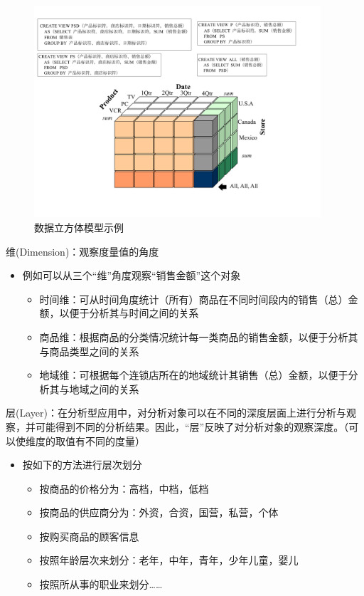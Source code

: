 \begin{solution}
\begin{figure}[H]
    \centering
    \vspace{-0.2em}
    \includegraphics[width=0.95\textwidth]{images/数据立方体.pdf}
    \caption*{数据立方体模型示例}
    \vspace{-1em}
\end{figure}

维(Dimension)：观察度量值的角度
\begin{itemize}
    \item 例如可以从三个“维”角度观察“销售金额”这个对象
    \begin{itemize}
        \item 时间维：可从时间角度统计（所有）商品在不同时间段内的销售（总）金额，以便于分析其与时间之间的关系
        \item 商品维：根据商品的分类情况统计每一类商品的销售金额，以便于分析其与商品类型之间的关系
        \item 地域维：可根据每个连锁店所在的地域统计其销售（总）金额，以便于分析其与地域之间的关系
    \end{itemize}
\end{itemize}

层(Layer)：在分析型应用中，对分析对象可以在不同的深度层面上进行分析与观察，并可能得到不同的分析结果。因此，“层”反映了对分析对象的观察深度。（可以使维度的取值有不同的度量）
\begin{itemize}
    \item 按如下的方法进行层次划分
    \begin{itemize}
        \item 按商品的价格分为：高档，中档，低档
        \item 按商品的供应商分为：外资，合资，国营，私营，个体
        \item 按购买商品的顾客信息
        \item 按照年龄层次来划分：老年，中年，青年，少年儿童，婴儿
        \item 按照所从事的职业来划分……
    \end{itemize}
\end{itemize}


\end{solution}
